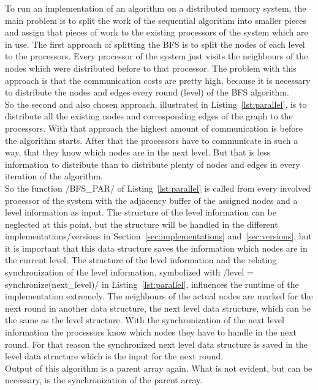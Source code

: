\documentclass[12pt,a4paper]{article}
\begin{document}
To run an implementation of an algorithm on a distributed memory system, the main problem is to split the work of the sequential algorithm into smaller pieces and assign that pieces of work to the existing processors of the system which are in use.  The first approach of splitting the BFS is to split the nodes of each level to the processors. Every processor of the system just visits the neighbours of the nodes which were distributed before to that processor. The problem with this approach is that the communication costs are pretty high, because it is necessary to distribute the nodes and edges every round (level) of the BFS algorithm.\\
So the second and also chosen approach, illustrated in Listing~\ref{lst:parallel}, is to distribute all the existing nodes and corresponding edges of the graph to the processors. With that approach the highest amount of communication is before the algorithm starts. After that the processors have to communicate in such a way, that they know which nodes are in the next level. But that is less information to distribute than to distribute plenty of nodes and edges in every iteration of the algorithm.\\
So the function \cinline/BFS_PAR/ of Listing~\ref{lst:parallel} is called from every involved processor of the system with the adjacency buffer of the assigned nodes and a level information as input. The structure of the level information can be neglected at this point, but the structure will be handled in the different implementations/versions in Section~\ref{sec:implementations} and~\ref{sec:versions}, but it is important that this data structure saves the information which nodes are in the current level. The structure of the level information and the relating synchronization of the level information, symbolized with \cinline/level = synchronize(next_level)/ in Listing~\ref{lst:parallel}, influences the runtime of the implementation extremely. The neighbours of the actual nodes are marked for the next round in another data structure, the next level data structure, which can be the same as the level structure. With the synchronization of the next level information the processors know which nodes they have to handle in the next round. For that reason the synchronized next level data structure is saved in the level data structure which is the input for the next round.\\
Output of this algorithm is a parent array again. What is not evident, but can be necessary, is the synchronization of the parent array. 
\end{document}
